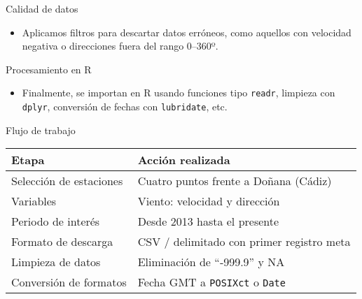 \documentclass[
]{article}
\providecommand{\tightlist}{%
  \setlength{\itemsep}{0pt}\setlength{\parskip}{0pt}}
\begin{document}
Calidad de datos

\begin{itemize}
\tightlist
\item
  Aplicamos filtros para descartar datos erróneos, como aquellos con velocidad negativa o direcciones fuera del rango 0--360º.
\end{itemize}

Procesamiento en R

\begin{itemize}
\tightlist
\item
  Finalmente, se importan en R usando funciones tipo \texttt{readr}, limpieza con \texttt{dplyr}, conversión de fechas con \texttt{lubridate}, etc.
\end{itemize}

Flujo de trabajo

\begin{longtable}[]{@{}
  >{\raggedright\arraybackslash}p{}
  >{\raggedright\arraybackslash}p{}@{}}
\toprule\noalign{}
\begin{minipage}[b]{\linewidth}\raggedright
Etapa
\end{minipage} & \begin{minipage}[b]{\linewidth}\raggedright
Acción realizada
\end{minipage} \\
\midrule\noalign{}
\endhead
\bottomrule\noalign{}
\endlastfoot
Selección de estaciones & Cuatro puntos frente a Doñana (Cádiz) \\
Variables & Viento: velocidad y dirección \\
Periodo de interés & Desde 2013 hasta el presente \\
Formato de descarga & CSV / delimitado con primer registro meta \\
Limpieza de datos & Eliminación de ``‑999.9'' y NA \\
Conversión de formatos & Fecha GMT a \texttt{POSIXct} o \texttt{Date} \\
\end{longtable}
\end{document}
